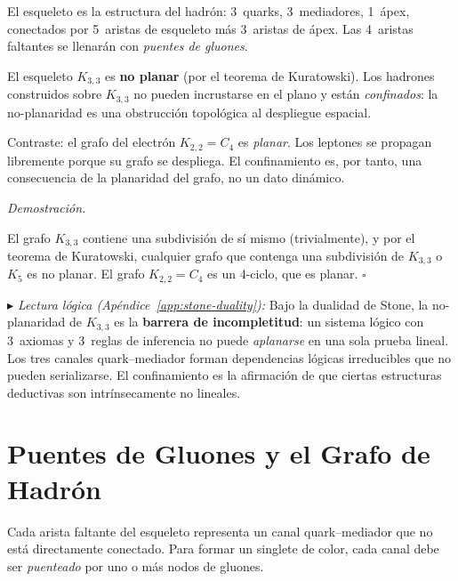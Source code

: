 \documentclass[11pt, a4paper, openany]{book}
\newcommand{\stoneref}[1]{%
  \smallskip\noindent
  {\small\color{structure!70}\textit{$\blacktriangleright$ Lectura
  l\'ogica (Ap\'endice~\ref{app:stone-duality}):} #1}%
  \smallskip}
\renewenvironment{proof}[1][Demostraci\'on]{%
  \par\noindent\textit{#1.}\quad
}{\hfill$\square$\par\medskip}
\begin{document}
El esqueleto es la estructura del hadr\'on: 3~quarks, 3~mediadores,
1~\'apex, conectados por 5~aristas de esqueleto m\'as 3~aristas de
\'apex.  Las 4~aristas faltantes se llenar\'an con \emph{puentes de
gluones}.

\begin{theorem}
\label{thm:hadron-confinement}
El esqueleto $K_{3,3}$ es \textbf{no planar} (por el teorema de
Kuratowski).  Los hadrones construidos sobre $K_{3,3}$ no pueden
incrustarse en el plano y est\'an \emph{confinados}: la
no-planaridad es una obstrucci\'on topol\'ogica al despliegue
espacial.

Contraste: el grafo del electr\'on $K_{2,2} = C_4$ es
\emph{planar}.  Los leptones se propagan libremente porque su
grafo se despliega.  El confinamiento es, por tanto, una
consecuencia de la planaridad del grafo, no un dato din\'amico.
\end{theorem}

\begin{proof}
El grafo $K_{3,3}$ contiene una subdivisi\'on de s\'i mismo
(trivialmente), y por el teorema de Kuratowski, cualquier grafo que
contenga una subdivisi\'on de $K_{3,3}$ o $K_5$ es no planar.
El grafo $K_{2,2} = C_4$ es un 4-ciclo, que es planar.
\end{proof}

\stoneref{Bajo la dualidad de Stone, la no-planaridad de $K_{3,3}$
es la \textbf{barrera de incompletitud}: un sistema l\'ogico con
3~axiomas y 3~reglas de inferencia no puede \emph{aplanarse} en una
sola prueba lineal.  Los tres canales quark--mediador forman
dependencias l\'ogicas irreducibles que no pueden serializarse.
El confinamiento es la afirmaci\'on de que ciertas estructuras
deductivas son intr\'insecamente no lineales.}

\section{Puentes de Gluones y el Grafo de Hadr\'on}
\label{sec:gluon-bridges}

Cada arista faltante del esqueleto representa un canal
quark--mediador que no est\'a directamente conectado.  Para formar
un singlete de color, cada canal debe ser \emph{puenteado} por uno
o m\'as nodos de gluones.
\end{document}
